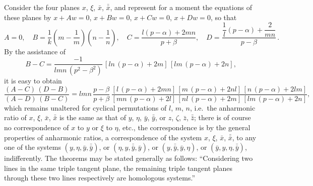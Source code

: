 \documentclass[11pt,a4paper]{book}
\begin{document}
Consider the four planes $x$, $\xi$, $\bar{x}$, $\bar{\bar{x}}$, and represent for a moment the equations of these planes by $x + Aw = 0$, $x + Bw = 0$, $x + Cw = 0$, $x + Dw = 0$, so that
\[
A = 0, \quad B = \frac{1}{k}\left(m - \frac{1}{m}\right)\left(n - \frac{1}{n}\right), \quad C = \frac{l(p - \alpha) + 2mn}{p + \beta}, \quad D = \frac{\dfrac{1}{l}(p - \alpha) + \dfrac{2}{mn}}{p - \beta}\,.
\]
By the assistance of
\[
B - C = \frac{-1}{lmn\,(p^2 - \beta^2)}\,[ln\,(p - \alpha) + 2m]\,[lm\,(p - \alpha) + 2n],
\]
it is easy to obtain
\[
\frac{(A - C)\,(D - B)}{(A - D)\,(B - C)} = lmn\,\frac{p - \beta}{p + \beta}\,
\frac{[l\,(p - \alpha) + 2mn]\,[m\,(p - \alpha) + 2nl]\,[n\,(p - \alpha) + 2lm]}
{[mn\,(p - \alpha) + 2l]\,[nl\,(p - \alpha) + 2m]\,[lm\,(p - \alpha) + 2n]},
\]
which remains unaltered for cyclical permutations of $l$, $m$, $n$, i.e.\ the anharmonic ratio of $x$, $\xi$, $\bar{x}$, $\bar{\bar{x}}$ is the same as that of $y$, $\eta$, $\bar{y}$, $\bar{\bar{y}}$, or $z$, $\zeta$, $\bar{z}$, $\bar{\bar{z}}$; there is of course no correspondence of $x$ to $y$ or $\xi$ to $\eta$, etc., the correspondence is by the general properties of anharmonic ratios, a correspondence of the system $x$, $\xi$, $\bar{x}$, $\bar{\bar{x}}$, to any one of the systems $(y, \eta, \bar{y}, \bar{\bar{y}})$, or $(\eta, y, \bar{\bar{y}}, \bar{y})$, or $(y, \bar{\bar{y}}, \bar{y}, \eta)$, or $(\bar{y}, y, \eta, \bar{\bar{y}})$, indifferently. The theorems may be stated generally as follows: ``Considering two lines in the same triple tangent plane, the remaining triple tangent planes through these two lines respectively are homologous systems.''
\end{document}
